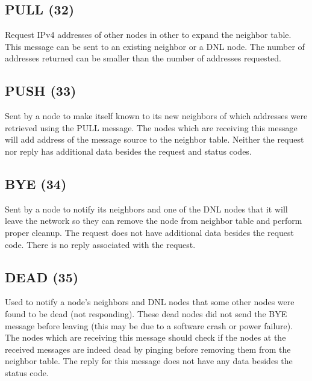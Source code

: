 \subsection{PULL (32)}

Request IPv4 addresses of other nodes in other to expand the neighbor table. 
This message can be sent to an existing neighbor or a DNL node. The number of 
addresses returned can be smaller than the number of addresses requested.

\begin{figure}[H]
    \centering
\end{figure}

\subsection{PUSH (33)}

Sent by a node to make itself known to its new neighbors of which addresses 
were retrieved using the PULL message. The nodes which are receiving this 
message will add address of the message source to the neighbor table. Neither 
the request nor reply has additional data besides the request and status codes.

\subsection{BYE (34)}

Sent by a node to notify its neighbors and one of the DNL nodes that it will 
leave the network so they can remove the node from neighbor table and perform 
proper cleanup. The request does not have additional data besides the request 
code. There is no reply associated with the request.

\subsection{DEAD (35)}

Used to notify a node's neighbors and DNL nodes that some other nodes were 
found to be dead (not responding). These dead nodes did not send the BYE 
message before leaving (this may be due to a software crash or power failure). 
The nodes which are receiving this message should check if the nodes at the 
received messages are indeed dead by pinging before removing them from the 
neighbor table. The reply for this message does not have any data besides the 
status code.

